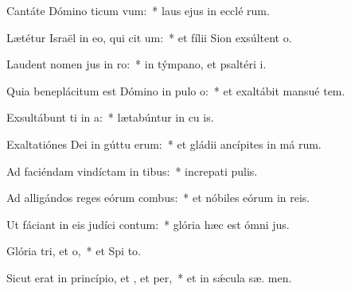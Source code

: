 \item Cantáte Dómino ticum vum:~* laus ejus in ecclé rum.
\item Lætétur Israël in eo, qui cit um:~* et fílii Sion exsúltent   o.
\item Laudent nomen jus in ro:~* in týmpano, et psaltéri  i.
\item Quia beneplácitum est Dómino in pulo o:~* et exaltábit mansué  tem.
\item Exsultábunt ti in a:~* lætabúntur in cu is.
\item Exaltatiónes Dei in gúttu erum:~* et gládii ancípites in má rum.
\item Ad faciéndam vindíctam in tibus:~* increpati  pulis.
\item Ad alligándos reges eórum  combus:~* et nóbiles eórum in  reis.
\item Ut fáciant in eis judíci contum:~* glória hæc est ómni  jus.
\item Glória tri, et o,~* et Spi to.
\item Sicut erat in princípio, et , et per,~* et in sǽcula sæ. men.

